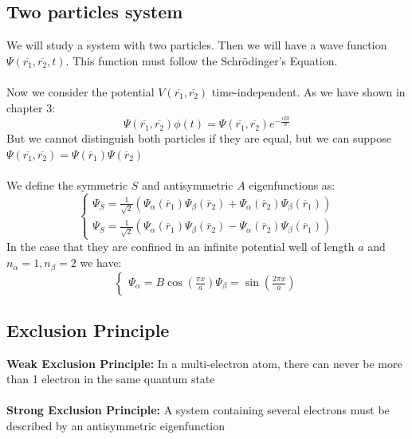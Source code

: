 \documentclass{myclass}
\newcommand{\h}{\hbar}
\begin{document}
\subsection{Two particles system}
We will study a system with two particles. Then we will have a wave function $\Psi \left( \overline{r_1}, \overline{r_2}, t \right) $. This function must follow the Schrödinger's Equation. \\
\\
Now we consider the potential $V(\overline{r_1}, \overline{r_2})$ time-independent. As we have shown in chapter 3:
\[
\Psi\left( \overline{r_1}, \overline{r_2} \right)\phi(t) = \Psi(\overline{r_1}, \overline{r_2})e^{-\frac{iEt}{\h}}
\] 
But we cannot distinguish both particles if they are equal, but we can suppose $\Psi\left( \overline{r_1}, \overline{r_2} \right) = \Psi(\overline{r}_1)\Psi(\overline{r}_2)$ \\
\\
We define the symmetric $S$ and antisymmetric $A$ eigenfunctions as:
\[
\begin{cases}
\Psi_S = \frac{1}{\sqrt{2} }\left( \Psi_\alpha(\overline{r}_1)\Psi_\beta(\overline{r}_2) + \Psi_\alpha(\overline{r}_2)\Psi_\beta(\overline{r}_1) \right) \\
\Psi_S = \frac{1}{\sqrt{2} }\left( \Psi_\alpha(\overline{r}_1)\Psi_\beta(\overline{r}_2) - \Psi_\alpha(\overline{r}_2)\Psi_\beta(\overline{r}_1) \right) 
\end{cases}   
\] 
In the case that they are confined in an infinite potential well of length $a$ and $n_\alpha = 1, n_\beta = 2$ we have:
\[
\begin{cases}
  \Psi_\alpha = B\cos\left( \frac{\pi x}{a} \right) 
  \Psi_\beta = \sin\left( \frac{2\pi x}{a} \right) 
\end{cases}
\] 

\subsection{Exclusion Principle}
\textbf{Weak Exclusion Principle:} In a multi-electron atom, there can never be more than 1 electron in the same quantum state\\
\\
\textbf{Strong Exclusion Principle:} A system containing several electrons must be described by an antisymmetric eigenfunction \\
\end{document}

